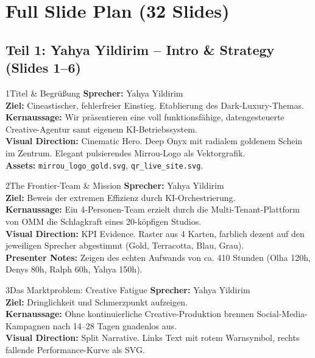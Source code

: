 \documentclass[11pt,a4paper]{article}
\begin{document}
\newpage

\section{Full Slide Plan (32 Slides)}

\subsection{Teil 1: Yahya Yildirim -- Intro \& Strategy (Slides 1--6)}

\begin{slidebox}{1}{Titel \& Begrüßung}
    \textbf{Sprecher:} Yahya Yildirim \\
    \textbf{Ziel:} Cineastischer, fehlerfreier Einstieg. Etablierung des Dark-Luxury-Themas.\\
    \textbf{Kernaussage:} Wir präsentieren eine voll funktionsfähige, datengesteuerte Creative-Agentur samt eigenem KI-Betriebssystem.\\
    \textbf{Visual Direction:} Cinematic Hero. Deep Onyx mit radialem goldenem Schein im Zentrum. Elegant pulsierendes Mirrou-Logo als Vektorgrafik.\\
    \textbf{Assets:} \texttt{mirrou\_logo\_gold.svg}, \texttt{qr\_live\_site.svg}.
\end{slidebox}

\begin{slidebox}{2}{The Frontier-Team \& Mission}
    \textbf{Sprecher:} Yahya Yildirim \\
    \textbf{Ziel:} Beweis der extremen Effizienz durch KI-Orchestrierung.\\
    \textbf{Kernaussage:} Ein 4-Personen-Team erzielt durch die Multi-Tenant-Plattform von OMM die Schlagkraft eines 20-köpfigen Studios.\\
    \textbf{Visual Direction:} KPI Evidence. Raster aus 4 Karten, farblich dezent auf den jeweiligen Sprecher abgestimmt (Gold, Terracotta, Blau, Grau).\\
    \textbf{Presenter Notes:} Zeigen des echten Aufwands von ca. 410 Stunden (Olha 120h, Denys 80h, Ralph 60h, Yahya 150h).
\end{slidebox}

\begin{slidebox}{3}{Das Marktproblem: Creative Fatigue}
    \textbf{Sprecher:} Yahya Yildirim \\
    \textbf{Ziel:} Dringlichkeit und Schmerzpunkt aufzeigen.\\
    \textbf{Kernaussage:} Ohne kontinuierliche Creative-Produktion brennen Social-Media-Kampagnen nach 14--28 Tagen gnadenlos aus.\\
    \textbf{Visual Direction:} Split Narrative. Links Text mit rotem Warnsymbol, rechts fallende Performance-Kurve als SVG.
\end{slidebox}
\end{document}
